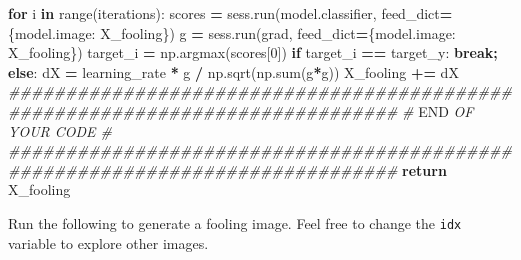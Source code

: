 \documentclass[]{book}
\newenvironment{Shaded}{\begin{snugshade}}{\end{snugshade}}
\newcommand{\KeywordTok}[1]{\textcolor[rgb]{0.13,0.29,0.53}{\textbf{#1}}}
\newcommand{\DecValTok}[1]{\textcolor[rgb]{0.00,0.00,0.81}{#1}}
\newcommand{\CommentTok}[1]{\textcolor[rgb]{0.56,0.35,0.01}{\textit{#1}}}
\newcommand{\ControlFlowTok}[1]{\textcolor[rgb]{0.13,0.29,0.53}{\textbf{#1}}}
\newcommand{\OperatorTok}[1]{\textcolor[rgb]{0.81,0.36,0.00}{\textbf{#1}}}
\newcommand{\BuiltInTok}[1]{#1}
\newcommand{\RegionMarkerTok}[1]{#1}
\newcommand{\NormalTok}[1]{#1}
\theoremstyle{definition}
\theoremstyle{definition}
\theoremstyle{definition}
\theoremstyle{remark}
\begin{document}
\begin{Shaded}
\begin{Highlighting}[]
    \ControlFlowTok{for}\NormalTok{ i }\KeywordTok{in} \BuiltInTok{range}\NormalTok{(iterations):}
\NormalTok{        scores }\OperatorTok{=}\NormalTok{ sess.run(model.classifier, feed_dict}\OperatorTok{=}\NormalTok{\{model.image: X_fooling\})}
\NormalTok{        g }\OperatorTok{=}\NormalTok{ sess.run(grad, feed_dict}\OperatorTok{=}\NormalTok{\{model.image: X_fooling\})}
\NormalTok{        target_i }\OperatorTok{=}\NormalTok{ np.argmax(scores[}\DecValTok{0}\NormalTok{])}
        \ControlFlowTok{if}\NormalTok{ target_i }\OperatorTok{==}\NormalTok{ target_y:}
            \ControlFlowTok{break}\OperatorTok{;}
        \ControlFlowTok{else}\NormalTok{:}
\NormalTok{            dX }\OperatorTok{=}\NormalTok{ learning_rate }\OperatorTok{*}\NormalTok{ g }\OperatorTok{/}\NormalTok{ np.sqrt(np.}\BuiltInTok{sum}\NormalTok{(g}\OperatorTok{*}\NormalTok{g))}
\NormalTok{            X_fooling }\OperatorTok{+=}\NormalTok{ dX}
    \CommentTok{##############################################################################}
    \CommentTok{#                             }\RegionMarkerTok{END}\CommentTok{ OF YOUR CODE                               #}
    \CommentTok{##############################################################################}
    \ControlFlowTok{return}\NormalTok{ X_fooling}
\end{Highlighting}
\end{Shaded}

Run the following to generate a fooling image. Feel free to change the
\texttt{idx} variable to explore other images.
\end{document}
